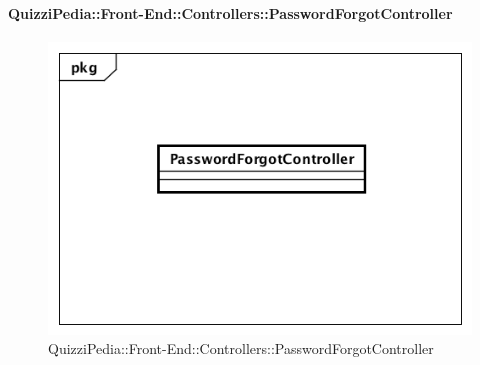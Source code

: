 \paragraph{QuizziPedia::Front-End::Controllers::PasswordForgotController}
\begin{figure}
	\centering
	\includegraphics[scale=0.45]{UML/Classi/Front-End/QuizziPedia_Front-end_Controller_PasswordForgotController.png}
	\caption{QuizziPedia::Front-End::Controllers::PasswordForgotController}
\end{figure}
